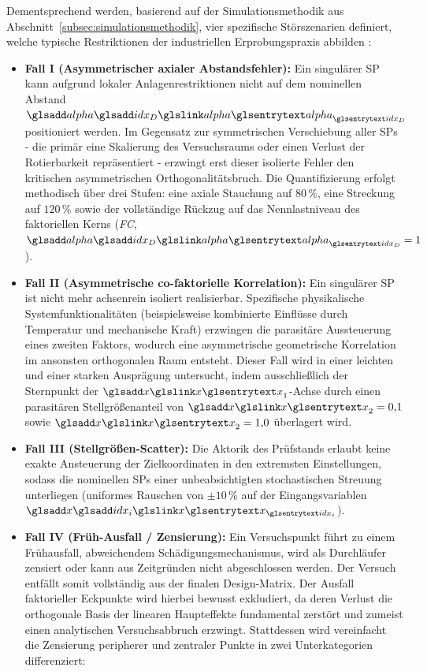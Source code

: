 Dementsprechend werden, basierend auf der Simulationsmethodik aus Abschnitt~\ref{subsec:simulationsmethodik}, vier spezifische Störszenarien definiert, welche typische Restriktionen der industriellen Erprobungspraxis abbilden \cite{Arndt.2022,Mell.2022}:

\begin{itemize}
    \item \textbf{Fall I (Asymmetrischer axialer Abstandsfehler):} Ein singulärer \ac{SP} kann aufgrund lokaler Anlagenrestriktionen nicht auf dem nominellen Abstand $\symsub{alpha}{idx_D}$ positioniert werden.
          Im Gegensatz zur symmetrischen Verschiebung aller \acp{SP} - die primär eine Skalierung des Versuchsraums oder einen Verlust der Rotierbarkeit repräsentiert - erzwingt erst dieser isolierte Fehler den kritischen asymmetrischen Orthogonalitätsbruch.
          Die Quantifizierung erfolgt methodisch über drei Stufen: eine axiale Stauchung auf $80\,\%$, eine Streckung auf $120\,\%$ sowie der vollständige Rückzug auf das Nennlastniveau des faktoriellen Kerns (\textit{\ac{FC}}, $\symsub{alpha}{idx_D}=1$).
    \item \textbf{Fall II (Asymmetrische co-faktorielle Korrelation):} Ein singulärer \ac{SP} ist nicht mehr achsenrein isoliert realisierbar. Spezifische physikalische Systemfunktionalitäten (beispielsweise kombinierte Einflüsse durch Temperatur und mechanische Kraft) erzwingen die parasitäre Aussteuerung eines zweiten Faktors, wodurch eine asymmetrische geometrische Korrelation im ansonsten orthogonalen Raum entsteht.
          Dieser Fall wird in einer leichten und einer starken Ausprägung untersucht, indem ausschließlich der Sternpunkt der $\sym{x}_1$-Achse durch einen parasitären Stellgrößenanteil von $\sym{x}_2 = 0{,}1$ sowie $\sym{x}_2 = 1{,}0$ überlagert wird.
    \item \textbf{Fall III (Stellgrößen-Scatter):} Die Aktorik des Prüfstands erlaubt keine exakte Ansteuerung der Zielkoordinaten in den extremsten Einstellungen, sodass die nominellen \acp{SP} einer unbeabsichtigten stochastischen Streuung unterliegen (uniformes Rauschen von $\pm 10\,\%$ auf der Eingangsvariablen $\symsub{x}{idx_i}$).
    \item \textbf{Fall IV (Früh-Ausfall / Zensierung):} Ein Versuchspunkt führt zu einem Frühausfall, abweichendem Schädigungsmechanismus, wird als Durchläufer zensiert oder kann aus Zeitgründen nicht abgeschlossen werden. Der Versuch entfällt somit vollständig aus der finalen Design-Matrix.
          Der Ausfall faktorieller Eckpunkte wird hierbei bewusst exkludiert, da deren Verlust die orthogonale Basis der linearen Haupteffekte fundamental zerstört und zumeist einen analytischen Versuchsabbruch erzwingt. Stattdessen wird vereinfacht die Zensierung peripherer und zentraler Punkte in zwei Unterkategorien differenziert:

\end{itemize}
